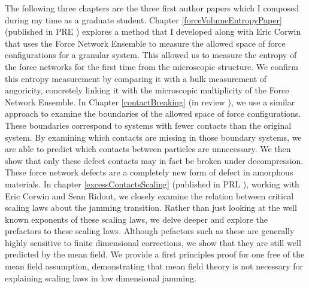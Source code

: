 The following three chapters are the three first author papers which I composed during my time as a graduate student. Chapter \ref{forceVolumeEntropyPaper} (published in PRE \cite{sartor_direct_2020}) explores a method that I developed along with Eric Corwin that uses the Force Network Ensemble to measure the allowed space of force configurations for a granular system. This allowed us to measure the entropy of the force networks for the first time from the microscopic structure. We confirm this entropy measurement by comparing it with a bulk measurement of angoricity, concretely linking it with the microscopic multiplicity of the Force Network Ensemble. In Chapter \ref{contactBreaking} (in review \cite{sartor_predicting_2021}), we use a similar approach to examine the boundaries of the allowed space of force configurations. These boundaries correspond to systems with fewer contacts than the original system. By examining which contacts are missing in those boundary systems, we are able to predict which contacts between particles are unnecessary. We then show that only these defect contacts may in fact be broken under decompression. These force network defects are a completely new form of defect in amorphous materials. In chapter \ref{excessContactsScaling} (published in PRL \cite{sartor_mean-field_2021}), working with Eric Corwin and Sean Ridout, we closely examine the relation between critical scaling laws about the jamming transition. Rather than just looking at the well known exponents of these scaling laws, we delve deeper and explore the prefactors to these scaling laws. Although pefactors such as these are generally highly sensitive to finite dimensional corrections, we show that they are still well predicted by the mean field. We provide a first principles proof for one free of the mean field assumption, demonstrating that mean field theory is not necessary for explaining scaling laws in low dimensional jamming.
